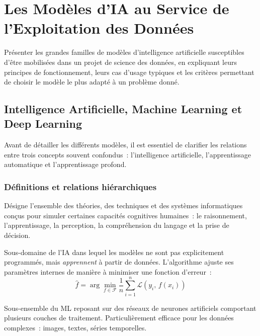 \chapter{Les Modèles d'IA au Service de l'Exploitation des Données}

\begin{objectifbox}
Présenter les grandes familles de modèles d'intelligence artificielle susceptibles d'être mobilisées dans un projet de science des données, en expliquant leurs principes de fonctionnement, leurs cas d'usage typiques et les critères permettant de choisir le modèle le plus adapté à un problème donné.
\end{objectifbox}

\section{Intelligence Artificielle, Machine Learning et Deep Learning}

Avant de détailler les différents modèles, il est essentiel de clarifier les relations entre trois concepts souvent confondus~: l'intelligence artificielle, l'apprentissage automatique et l'apprentissage profond.

\subsection{Définitions et relations hiérarchiques}

\begin{description}[leftmargin=1.5cm, itemsep=4pt]
  \item[Intelligence Artificielle (IA)] Désigne l'ensemble des théories, des techniques et des systèmes informatiques conçus pour simuler certaines capacités cognitives humaines~: le raisonnement, l'apprentissage, la perception, la compréhension du langage et la prise de décision.
  \item[Machine Learning (ML)] Sous-domaine de l'IA dans lequel les modèles ne sont pas explicitement programmés, mais \textit{apprennent} à partir de données. L'algorithme ajuste ses paramètres internes de manière à minimiser une fonction d'erreur~:
  \[
    \hat{f} = \arg\min_{f \in \mathcal{F}} \frac{1}{n}\sum_{i=1}^{n} \mathcal{L}\!\left(y_i,\, f(x_i)\right)
  \]
  \item[Deep Learning (DL)] Sous-ensemble du ML reposant sur des réseaux de neurones artificiels comportant plusieurs couches de traitement. Particulièrement efficace pour les données complexes~: images, textes, séries temporelles.
\end{description}

